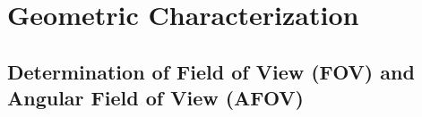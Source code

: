 


\section{Geometric Characterization}

\subsection{Determination of Field of View (FOV) and Angular Field of View (AFOV)}
\label{sec:fov}


